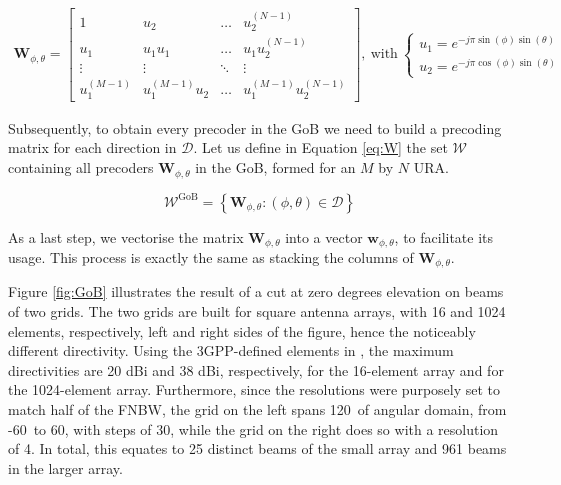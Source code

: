 \begin{align} \label{eq:prec_func}
    \bm{W}_{\phi, \theta}= 
    \begin{bmatrix}
        1 & u_2 & \dots & u_2^{(N-1)}\\
        u_1 & u_1 u_1 & \dots & u_1 u_2^{(N-1)}\\
        \vdots & \vdots & \ddots & \vdots\\
        u_1^{(M-1)} & u_1^{(M-1)} u_2 & \dots & u_1^{(M-1)} u_2^{(N-1)}
    \end{bmatrix}, \ \text{with} \
    \begin{cases}
        u_1 = e^{-j \pi \sin(\phi) \sin(\theta)} \\
        u_2 = e^{-j \pi \cos(\phi) \sin(\theta)}
    \end{cases}
\end{align}


Subsequently, to obtain every precoder in the GoB we need to build a precoding matrix for each direction in $\mathcal{D}$. Let us define in Equation \eqref{eq:W} the set $\mathcal{W}$ containing all precoders $\bm{W}_{\phi, \theta}$ in the GoB, formed for an $M$ by $N$ \ac{URA}. 

\begin{equation} \label{eq:W}
    \mathcal{W}^\text{GoB} = \left\{ \bm{W}_{\phi, \theta} : (\phi, \theta) \in \mathcal{D}\right\}
\end{equation}

As a last step, we vectorise the matrix $\bm{W}_{\phi, \theta}$ into a vector $\bm{w}_{\phi, \theta}$, to facilitate its usage. This process is exactly the same as stacking the columns of $\bm{W}_{\phi, \theta}$.

Figure \ref{fig:GoB} illustrates the result of a cut at zero degrees elevation on beams of two grids. The two grids are built for square antenna arrays, with 16 and 1024 elements, respectively, left and right sides of the figure, hence the noticeably different directivity. Using the 3GPP-defined elements in \cite{3gpp_antennas}, the maximum directivities are 20 dBi and 38 dBi, respectively, for the 16-element array and for the 1024-element array. Furthermore, since the resolutions were purposely set to match half of the \ac{FNBW}, the grid on the left spans 120\textdegree \ of angular domain, from -60\textdegree \ to 60\textdegree, with steps of 30\textdegree, while the grid on the right does so with a resolution of 4\textdegree. In total, this equates to 25 distinct beams of the small array and 961 beams in the larger array.

